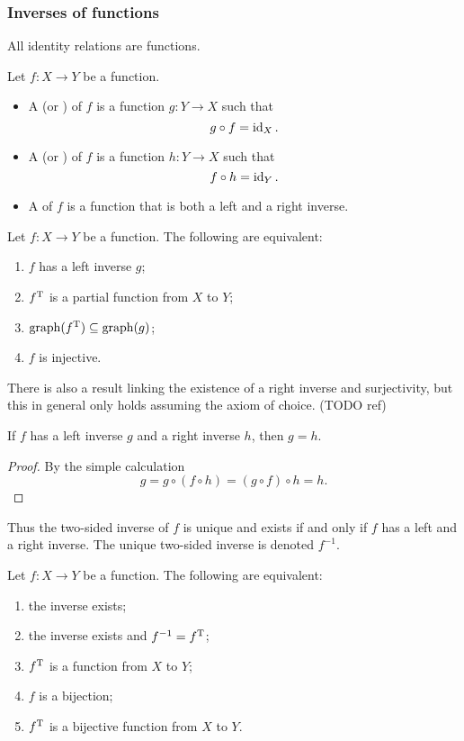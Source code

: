\subsubsection{Inverses of functions}
All identity relations are functions.

\begin{definition}
Let $f:X\to Y$ be a function.
\begin{itemize}
\item A  (or ) of $f$ is a function $g: Y\to X$ such that
\[ g\circ f = \operatorname{id}_X. \]
\item A  (or ) of $f$ is a function $h: Y\to X$ such that
\[ f\circ h = \operatorname{id}_Y. \]
\item A  of $f$ is a function that is both a left and a right inverse.
\end{itemize}
\end{definition}

\begin{lemma} \label{injectiveInverse}
Let $f:X\to Y$ be a function. The following are equivalent:
\begin{enumerate}
\item $f$ has a left inverse $g$;
\item $f^{\mathrm{T}}$ is a partial function from $X$ to $Y$; 
\item $\operatorname{graph}(f^{\mathrm{T}}) \subseteq \operatorname{graph}(g)$;
\item $f$ is injective.
\end{enumerate}
\end{lemma}
There is also a result linking the existence of a right inverse and surjectivity, but this in general only holds assuming the axiom of choice. (TODO ref)

\begin{lemma} \label{leftRightInverse}
If $f$ has a left inverse $g$ and a right inverse $h$, then $g=h$.
\end{lemma}
\begin{proof}
By the simple calculation
\[ g = g\circ (f\circ h) = (g\circ f) \circ h = h. \]
\end{proof}
Thus the two-sided inverse of $f$ is unique and exists \textup{if and only if} $f$ has a left and a right inverse. The unique two-sided inverse is denoted $f^{-1}$.

\begin{lemma}
Let $f:X\to Y$ be a function. The following are equivalent:
\begin{enumerate} 
\item the inverse exists;
\item the inverse exists and $f^{-1} = f^{\mathrm{T}}$;
\item $f^{\mathrm{T}}$ is a function from $X$ to $Y$;
\item $f$ is a bijection;
\item $f^{\mathrm{T}}$ is a bijective function from $X$ to $Y$.
\end{enumerate}
\end{lemma}

